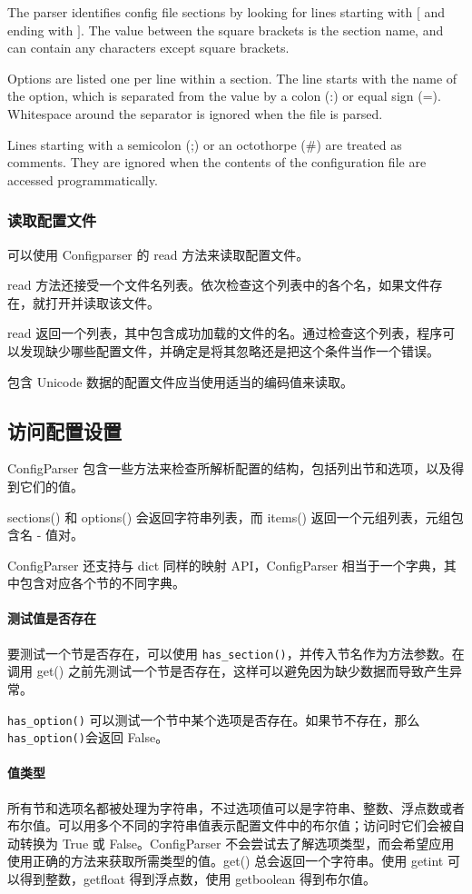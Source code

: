 The parser identifies config file sections by looking for lines starting with $[$ and ending with $]$. The value between the square brackets is the section name, and can contain any characters except square brackets.

Options are listed one per line within a section. The line starts with the name of the option, which is separated from the value by a colon (:) or equal sign (=). Whitespace around the separator is ignored when the file is parsed.

Lines starting with a semicolon (;) or an octothorpe ($\#$) are treated as comments. They are ignored when the contents of the configuration file are accessed programmatically.
\subsubsection{读取配置文件}
可以使用 Configparser 的 read 方法来读取配置文件。

read 方法还接受一个文件名列表。依次检查这个列表中的各个名，如果文件存在，就打开并读取该文件。

read 返回一个列表，其中包含成功加载的文件的名。通过检查这个列表，程序可以发现缺少哪些配置文件，并确定是将其忽略还是把这个条件当作一个错误。

包含 Unicode 数据的配置文件应当使用适当的编码值来读取。

\subsection{访问配置设置}
ConfigParser 包含一些方法来检查所解析配置的结构，包括列出节和选项，以及得到它们的值。

sections() 和 options() 会返回字符串列表，而 items() 返回一个元组列表，元组包含名 - 值对。

ConfigParser 还支持与 dict 同样的映射 API，ConfigParser 相当于一个字典，其中包含对应各个节的不同字典。

\paragraph{测试值是否存在} 要测试一个节是否存在，可以使用 \verb|has_section()|，并传入节名作为方法参数。在调用 get() 之前先测试一个节是否存在，这样可以避免因为缺少数据而导致产生异常。

\verb|has_option()| 可以测试一个节中某个选项是否存在。如果节不存在，那么 \verb|has_option()|会返回 False。

\paragraph{值类型} 所有节和选项名都被处理为字符串，不过选项值可以是字符串、整数、浮点数或者布尔值。可以用多个不同的字符串值表示配置文件中的布尔值；访问时它们会被自动转换为 True 或 False。ConfigParser 不会尝试去了解选项类型，而会希望应用使用正确的方法来获取所需类型的值。get() 总会返回一个字符串。使用 getint 可以得到整数，getfloat 得到浮点数，使用 getboolean 得到布尔值。

